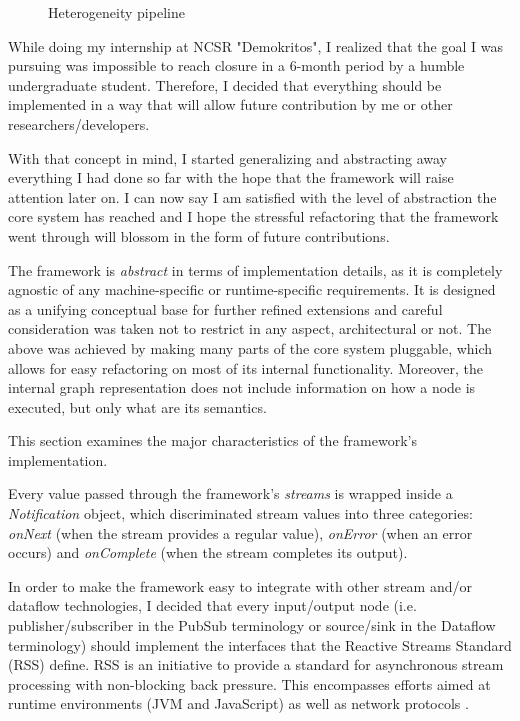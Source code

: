 \documentclass{dithesis}
\begin{document}
\begin{figure}[h!] 
	\centering
 	 
  	\caption{Heterogeneity pipeline}
\end{figure}


While doing my internship at NCSR "Demokritos", I realized that the goal I was pursuing was impossible to reach closure in a 6-month period by a humble undergraduate student. Therefore, I decided that everything should be implemented in a way that will allow future contribution by me or other researchers/developers. 

With that concept in mind, I started generalizing and abstracting away everything I had done so far with the hope that the framework will raise attention later on. I can now say I am satisfied with the level of abstraction the core system has reached and I hope the stressful refactoring that the framework went through will blossom in the form of future contributions.


The framework is \textit{abstract} in terms of implementation details, as it is completely agnostic of any machine-specific or runtime-specific requirements. It is designed as a unifying conceptual base for further refined extensions and careful consideration was taken not to restrict in any aspect, architectural or not. The above was achieved by making many parts of the core system pluggable, which allows for easy refactoring on most of its internal functionality. Moreover, the internal graph representation does not include information on how a node is executed, but only what are its semantics.

This section examines the major characteristics of the framework's implementation.

Every value passed through the framework's \textit{streams} is wrapped inside a \textit{Notification} object, which discriminated stream values into three categories: \textit{onNext} (when the stream provides a regular value), \textit{onError} (when an error occurs) and \textit{onComplete} (when the stream completes its output).

In order to make the framework easy to integrate with other stream and/or dataflow technologies, I decided that every input/output node (i.e. publisher/subscriber in the PubSub terminology or source/sink in the Dataflow terminology) should implement the interfaces that the Reactive Streams Standard (RSS) define. RSS is an initiative to provide a standard for asynchronous stream processing with non-blocking back pressure. This encompasses efforts aimed at runtime environments (JVM and JavaScript) as well as network protocols \cite{rss}.
\end{document}
